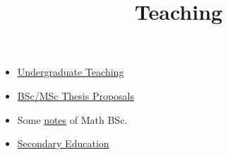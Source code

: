 \title{Teaching}

\begin{itemize}
  \item \href{/teaching/bsc-teaching/}{Undergraduate Teaching}
  \item \href{/teaching/thesis/}{BSc/MSc Thesis Proposals}
\end{itemize}

\begin{itemize}
  \item Some \href{/math/}{notes} of Math BSc.
  \item \href{/teaching/sec-teaching/}{Secondary Education}
\end{itemize}
